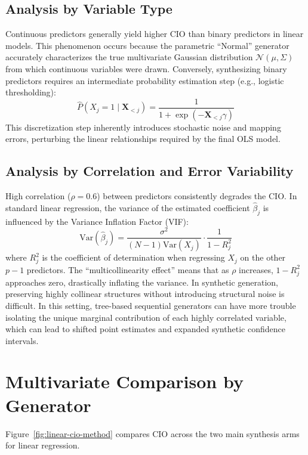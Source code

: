 \subsection{Analysis by Variable Type}
Continuous predictors generally yield higher CIO than binary predictors in linear models. This phenomenon occurs because the parametric ``Normal'' generator accurately characterizes the true multivariate Gaussian distribution $\mathcal{N}(\mu, \Sigma)$ from which continuous variables were drawn. Conversely, synthesizing binary predictors requires an intermediate probability estimation step (e.g., logistic thresholding):
\begin{equation}
    \hat{P}(X_j=1 \mid \mathbf{X}_{<j}) = \frac{1}{1 + \exp(-\mathbf{X}_{<j} \gamma)}
\end{equation}
This discretization step inherently introduces stochastic noise and mapping errors, perturbing the linear relationships required by the final OLS model.

\subsection{Analysis by Correlation and Error Variability}
High correlation ($\rho = 0.6$) between predictors consistently degrades the CIO. In standard linear regression, the variance of the estimated coefficient $\hat{\beta}_j$ is influenced by the Variance Inflation Factor (VIF):
\begin{equation}
    \text{Var}(\hat{\beta}_j) = \frac{\sigma^2}{(N-1)\text{Var}(X_j)} \cdot \frac{1}{1 - R_j^2}
\end{equation}
where $R_j^2$ is the coefficient of determination when regressing $X_j$ on the other $p-1$ predictors. The ``multicollinearity effect'' means that as $\rho$ increases, $1 - R_j^2$ approaches zero, drastically inflating the variance. In synthetic generation, preserving highly collinear structures without introducing structural noise is difficult. In this setting, tree-based sequential generators can have more trouble isolating the unique marginal contribution of each highly correlated variable, which can lead to shifted point estimates and expanded synthetic confidence intervals.

\section{Multivariate Comparison by Generator}
Figure~\ref{fig:linear-cio-method} compares CIO across the two main synthesis arms for linear regression.

